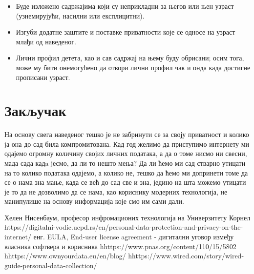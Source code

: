\documentclass[a4paper]{article}
\begin{document}
\begin{itemize}


\item	Буде изложено садржајима који су неприкладни за његов или њен узраст (узнемирујући, насилни или експлицитни).

\item	Изгуби додатне заштите и поставке приватности које се односе на узраст млађи од наведеног.

\item	Лични профил детета, као и сав садржај на њему буду обрисани; осим тога, може му бити онемогућено да отвори лични профил чак и онда када достигне прописани узраст.

\end{itemize}

\section{Закључак}
\paragraph{}

На основу свега наведеног тешко је не забринути се за своју приватност и колико ја она до сад била компромитована. Кад год желимо да приступимо интернету ми одајемо огромну количину својих личних података, а да о томе нисмо ни свесни, мада сада кадa јесмо, да ли то нешто мења? Да ли ћемо ми сад стварно утицати на то колико података одајемо, а колико не, тешко да ћемо ми допринети томе да се о нама зна мање, када се већ до сад све и зна, једино на шта можемо утицати је то да не дозволимо да се нама, као кориснику модерних технологија, не манипулише на основу информација које смо им сами дали.

\begin{thebibliography}{9}


 Хелен Нисенбаум, професор инфромационих технологија на Универзитету Корнел https://digitalni-vodic.ucpd.rs/en/personal-data-protection-and-privacy-on-the-internet/
 енг. EULA, End-user license agreement - дигитални уговор између власника софтвера и корисника
\bibitem hhttps://www.pnas.org/content/110/15/5802
\bibitem hhttps://www.ownyourdata.eu/en/blog/
\bibitem hhttps://www.wired.com/story/wired-guide-personal-data-collection/


\end{thebibliography}
\end{document}
